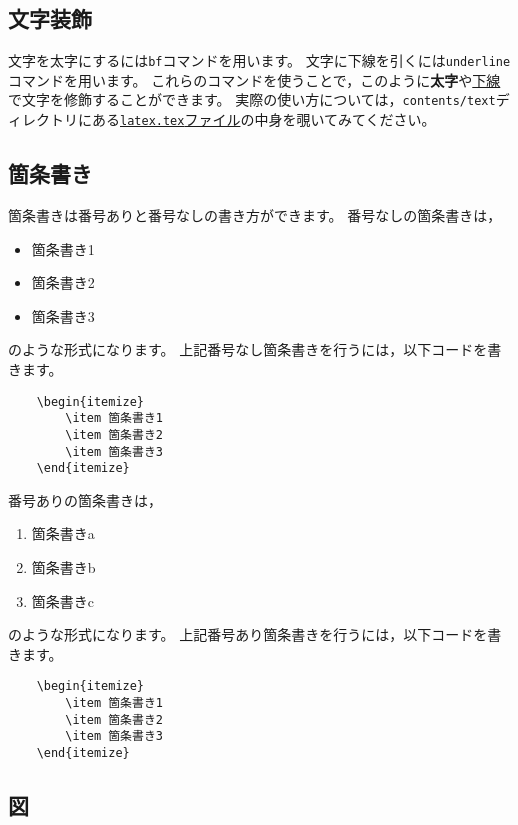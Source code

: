 \subsection{文字装飾}
文字を太字にするには{\tt bf}コマンドを用います。
文字に下線を引くには{\tt underline}コマンドを用います。
これらのコマンドを使うことで，このように{\bf 太字}や\underline{下線}で文字を修飾することができます。
実際の使い方については，\texttt{contents/text}ディレクトリにある\href{https://github.com/ymmt3-lab/DEIM-and-Thesis/blob/master/contents/text/latex.tex}{\texttt{latex.tex}ファイル}の中身を覗いてみてください。


\subsection{箇条書き}
箇条書きは番号ありと番号なしの書き方ができます。
番号なしの箇条書きは，
\begin{itemize}
\item 箇条書き1
\item 箇条書き2
\item 箇条書き3
\end{itemize}
のような形式になります。
上記番号なし箇条書きを行うには，以下コードを書きます。
\begin{verbatim}
    \begin{itemize}
        \item 箇条書き1
        \item 箇条書き2
        \item 箇条書き3
    \end{itemize}
\end{verbatim}

番号ありの箇条書きは，
\begin{enumerate}
\item 箇条書きa
\item 箇条書きb
\item 箇条書きc
\end{enumerate}
のような形式になります。
上記番号あり箇条書きを行うには，以下コードを書きます。
\begin{verbatim}
    \begin{itemize}
        \item 箇条書き1
        \item 箇条書き2
        \item 箇条書き3
    \end{itemize}
\end{verbatim}


\subsection{図}

